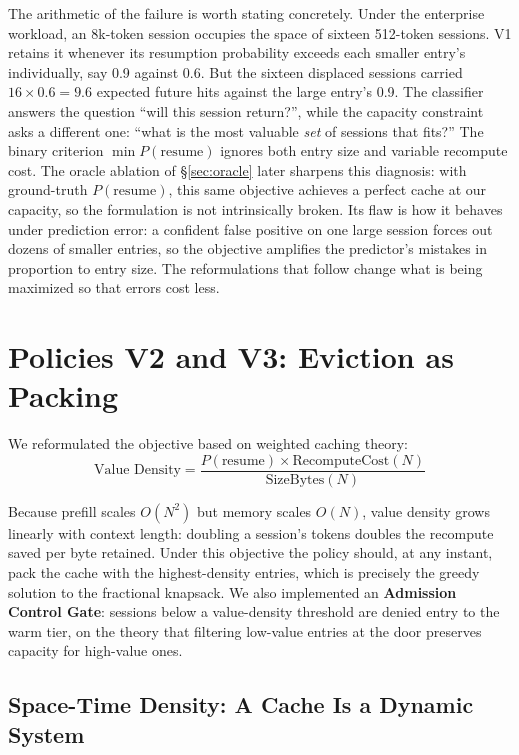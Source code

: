 \documentclass[letterpaper,twocolumn,10pt]{article}
\begin{document}
The arithmetic of the failure is worth stating concretely. Under the enterprise workload, an 8k-token session occupies the space of sixteen 512-token sessions. V1 retains it whenever its resumption probability exceeds each smaller entry's individually, say 0.9 against 0.6. But the sixteen displaced sessions carried $16 \times 0.6 = 9.6$ expected future hits against the large entry's 0.9. The classifier answers the question ``will this session return?'', while the capacity constraint asks a different one: ``what is the most valuable \emph{set} of sessions that fits?'' The binary criterion $\min P(\text{resume})$ ignores both entry size and variable recompute cost. The oracle ablation of \S\ref{sec:oracle} later sharpens this diagnosis: with ground-truth $P(\text{resume})$, this same objective achieves a perfect cache at our capacity, so the formulation is not intrinsically broken. Its flaw is how it behaves under prediction error: a confident false positive on one large session forces out dozens of smaller entries, so the objective amplifies the predictor's mistakes in proportion to entry size. The reformulations that follow change what is being maximized so that errors cost less.

\section{Policies V2 and V3: Eviction as Packing}

We reformulated the objective based on weighted caching theory:
\begin{equation}
  \text{Value Density} = \frac{P(\text{resume}) \times \text{RecomputeCost}(N)}{\text{SizeBytes}(N)}
  \label{eq:vd}
\end{equation}

Because prefill scales $O(N^2)$ but memory scales $O(N)$, value density grows linearly with context length: doubling a session's tokens doubles the recompute saved per byte retained. Under this objective the policy should, at any instant, pack the cache with the highest-density entries, which is precisely the greedy solution to the fractional knapsack. We also implemented an \textbf{Admission Control Gate}: sessions below a value-density threshold are denied entry to the warm tier, on the theory that filtering low-value entries at the door preserves capacity for high-value ones.

\subsection{Space-Time Density: A Cache Is a Dynamic System}
\label{sec:std}
\end{document}
